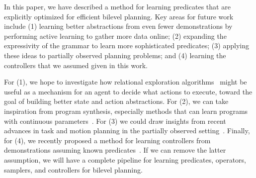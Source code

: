In this paper, we have described a method for learning predicates that are explicitly optimized for efficient bilevel planning.
Key areas for future work include (1) learning better abstractions from even fewer demonstrations by performing active learning to gather more data online; (2) expanding the expressivity of the grammar to learn more sophisticated predicates; (3) applying these ideas to partially observed planning problems; and (4) learning the controllers that we assumed given in this work.

For (1), we hope to investigate how relational exploration algorithms~\cite{chitnis2020glib} might be useful as a mechanism for an agent to decide what actions to execute, toward the goal of building better state and action abstractions.
For (2), we can take inspiration from program synthesis, especially methods that can learn programs with continuous parameters~\cite{ellis2020dreamcoder}.
For (3) we could draw insights from recent advances in task and motion planning in the partially observed setting~\cite{garrett2020online}.
Finally, for (4), we recently proposed a method for learning controllers from demonstrations assuming known predicates~\cite{silver2022learning}.
If we can remove the latter assumption, we will have a complete pipeline for learning predicates, operators, samplers, and controllers for bilevel planning.